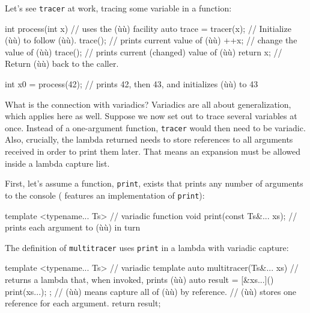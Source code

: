 Let's see \lstinline!tracer! at work, tracing some variable in a function:

\begin{emcppslisting}[emcppsbatch=e30]
int process(int x)           // uses the (ù{}ù) facility
{
    auto trace = tracer(x);  // Initialize (ù{}ù) to follow (ù{}ù).
    trace();                 // prints current value of (ù{}ù)
    ++x;                     // change the value of (ù{}ù)
    trace();                 // prints current (changed) value of (ù{}ù)
    return x;                // Return (ù{}ù) back to the caller.
}

int x0 = process(42);         // prints 42, then 43, and initializes (ù{}ù) to 43
\end{emcppslisting}
    

\noindent What is the connection with variadics? Variadics are all about
generalization, which applies here as well. Suppose we now set out to
trace several variables at once. Instead of a one-argument function,
\lstinline!tracer! would then need to be variadic. Also, crucially, the
lambda returned needs to store references to all arguments received in
order to print them later. That means an expansion must be allowed
inside a lambda capture list.

First, let's assume a function, \lstinline!print!, exists that prints any
number of arguments to the console ( features an implementation of \lstinline!print!):

\begin{emcppslisting}[emcppsbatch=e30]
template <typename... Ts>     // variadic function
void print(const Ts&... xs);  // prints each argument to (ù{}ù) in turn
\end{emcppslisting}
    

\noindent The definition of \lstinline!multitracer! uses \lstinline!print! in a lambda
with variadic capture:

\begin{emcppslisting}[emcppsbatch=e30]
template <typename... Ts>    // variadic template
auto multitracer(Ts&... xs)  // returns a lambda that, when invoked, prints (ù{}ù)
{
    auto result = [&xs...]() { print(xs...); };
        // (ù{\codeincomments{[\&xs...]}}ù) means capture all of (ù{}ù) by reference.
        // (ù{}ù) stores one reference for each argument.
    return result;
}
\end{emcppslisting}
    

